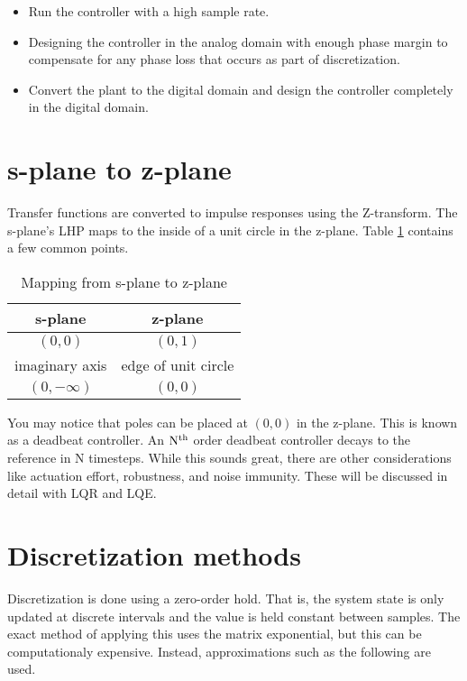 \begin{itemize}
  \item Run the controller with a high sample rate.
  \item Designing the controller in the analog domain with enough phase margin
    to compensate for any phase loss that occurs as part of discretization.
  \item Convert the \gls{plant} to the digital domain and design the controller
    completely in the digital domain.
\end{itemize}

\section{s-plane to z-plane}

Transfer functions are converted to impulse responses using the Z-transform. The
s-plane's LHP maps to the inside of a unit circle in the z-plane. Table
\ref{tab:s-plane2z-plane} contains a few common points. \\

\begin{table}
  \renewcommand{\arraystretch}{1.3}
  \centering
  \begin{tabular}{|cc|}
    \hline
    \rowcolor{headingbg}
    \textbf{s-plane} & \textbf{z-plane} \\
    \hline
    $(0, 0)$ & $(0, 1)$ \\
    imaginary axis & edge of unit circle \\
    $(0, -\infty)$ & $(0, 0)$ \\
    \hline
  \end{tabular}
  \caption{Mapping from s-plane to z-plane}
  \label{tab:s-plane2z-plane}
\end{table}

You may notice that poles can be placed at $(0, 0)$ in the z-plane. This is
known as a deadbeat controller. An $\rm N^{th}$ order deadbeat controller decays
to the \gls{reference} in N timesteps. While this sounds great, there are other
considerations like actuation effort, \gls{robustness}, and
\gls{noise immunity}. These will be discussed in detail with LQR and LQE.

\section{Discretization methods}

Discretization is done using a zero-order hold. That is, the system state is
only updated at discrete intervals and the value is held constant between
samples. The exact method of applying this uses the matrix exponential, but this
can be computationaly expensive. Instead, approximations such as the following
are used.

